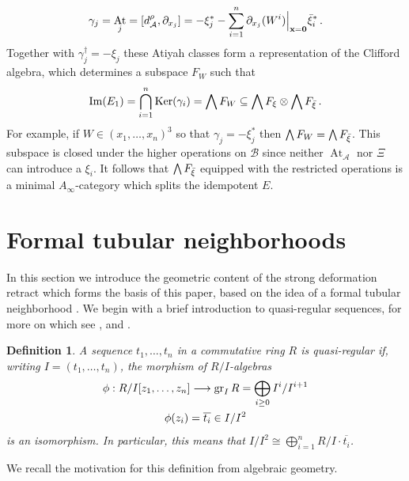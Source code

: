 \documentclass[english,letter paper,12pt,leqno]{article}
\theoremstyle{example}
\newtheorem{definition}[theorem]{Definition}
\numberwithin{equation}{section}
\def\AA{\mathcal{A}}
\def\BB{\mathcal{B}}
\def\Ker{\operatorname{Ker}}
\DeclareMathOperator{\At}{At}
\DeclareMathOperator{\vAt}{At}
\begin{document}
\[
\gamma_j = \At_j = [d_{\AA}^{\rho},\partial_{x_j}] = -\xi_j^* - \sum_{i=1}^n \partial_{x_j}(W^i)\Big|_{\bold{x} = \bold{0}} \Bar{\xi}_i^*\,.
\]
Together with $\gamma_j^\dagger = - \xi_j$ these Atiyah classes form a representation of the Clifford algebra, which determines a subspace $F_W$ such that 
\[
\operatorname{Im}(E_1) = \bigcap_{i=1}^n \Ker(\gamma_i) = \bigwedge F_W \subseteq \bigwedge F_\xi \otimes \bigwedge F_{\Bar{\xi}}\,.
\]
For example, if $W \in (x_1,\ldots,x_n)^3$ so that $\gamma_j = - \xi_j^*$ then $\bigwedge F_W = \bigwedge F_{\Bar{\xi}}$. This subspace is closed under the higher operations on $\BB$ since neither $\vAt_{\AA}$ nor $\Xi$ can introduce a $\xi_i$. It follows that $\bigwedge F_{\Bar{\xi}}$ equipped with the restricted operations is a minimal $A_\infty$-category which splits the idempotent $E$.

\appendix

\section{Formal tubular neighborhoods}\label{section:formaltub}

In this section we introduce the geometric content of the strong deformation retract which forms the basis of this paper, based on the idea of a formal tubular neighborhood \cite{cuntzquillen, lipman}. We begin with a brief introduction to quasi-regular sequences, for more on which see \cite[\S 15.B]{matsumura}, \cite[Chapitre $0$ \S 15.1]{EGA4} and \cite[Section\,10.68]{stacks_project}.

\begin{definition} A sequence $t_1,\ldots,t_n$ in a commutative ring $R$ is \emph{quasi-regular} if, writing $I = (t_1,\ldots,t_n)$, the morphism of $R/I$-algebras
\begin{gather*}
\phi: R/I[z_1,\ldots,z_n] \longrightarrow \operatorname{gr}_I R = \bigoplus_{i \ge 0} I^i / I^{i+1}\\
\phi(z_i) = \overline{t_i} \in I/I^2
\end{gather*}
is an isomorphism. In particular, this means that $I/I^2 \cong \bigoplus_{i=1}^n R/I \cdot \overline{t_i}$.
\end{definition}

We recall the motivation for this definition from algebraic geometry.
\end{document}
